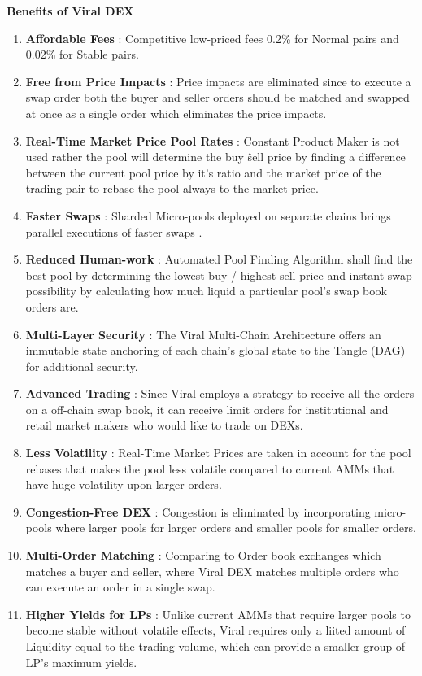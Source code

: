 \documentclass[10pt]{article}
\begin{document}
\textbf{Benefits of Viral DEX}
\begin{enumerate}[leftmargin=+0.2in]
\item \textbf{Affordable Fees} : Competitive low-priced fees 0.2\% for Normal pairs and 0.02\% for Stable pairs.
\item \textbf{Free from Price Impacts} : Price impacts are eliminated since to execute a swap order both the buyer and seller orders should be matched and swapped at once as a single order which eliminates the price impacts.
\item \textbf{Real-Time Market Price Pool Rates} : Constant Product Maker is not used rather the pool will determine the buy \^ sell price by finding a difference between the current pool price by it's ratio and the market price of the trading pair to rebase the pool always to the market price.
\item \textbf{Faster Swaps} : Sharded Micro-pools deployed on separate chains brings parallel executions of faster swaps .
\item \textbf{Reduced Human-work} : Automated Pool Finding Algorithm shall find the best pool by determining the lowest buy / highest sell price and instant swap possibility by calculating how much liquid a particular pool's swap book orders are.
\item \textbf{Multi-Layer Security} : The Viral Multi-Chain Architecture  offers an immutable state anchoring of each chain's global state to the Tangle (DAG) for additional security.
\item \textbf{Advanced Trading} : Since Viral employs a strategy to receive all the orders on a off-chain swap book, it can receive limit orders for institutional and retail market makers who would like to trade on DEXs.
\item \textbf{Less Volatility} : Real-Time Market Prices are taken in account for the pool rebases that makes the pool less volatile compared to current AMMs that have huge volatility upon larger orders.
\item \textbf{Congestion-Free DEX} : Congestion is eliminated by incorporating micro-pools where larger pools for larger orders and smaller pools for smaller orders.
\item \textbf{Multi-Order Matching} : Comparing to Order book exchanges which matches a buyer and seller, where Viral DEX matches multiple orders who can execute an order in a single swap.
\item \textbf{Higher Yields for LPs} : Unlike current AMMs that require larger pools to become stable without volatile effects, Viral requires only a liited amount of Liquidity equal to the trading volume, which can provide a smaller group of LP's maximum yields.
\end{enumerate}
\end{document}
